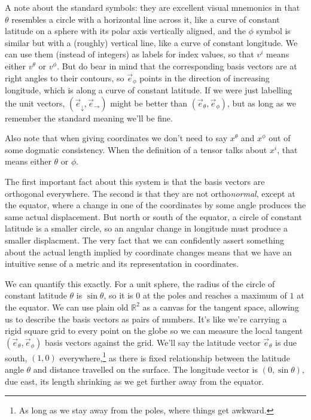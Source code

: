 A note about the standard symbols: they are excellent visual mnemonics in that $\theta$ resembles a circle with a horizontal line across it, like a curve of constant latitude on a sphere with its polar axis vertically aligned, and the $\phi$ symbol is similar but with a (roughly) vertical line, like a curve of constant longitude. We can use them (instead of integers) as labels for index values, so that $v^i$ means either $v^\theta$ or $v^\phi$. But do bear in mind that the corresponding basis vectors are at right angles to their contours, so $\vec{e}_{\phi}$ points in the direction of increasing longitude, which is along a curve of constant latitude. If we were just labelling the unit vectors, $(\vec{e}_{\downarrow}, \vec{e}_{\rightarrow})$ might be better than $(\vec{e}_{\theta}, \vec{e}_{\phi})$, but as long as we remember the standard meaning we'll be fine.

Also note that when giving coordinates we don't need to say $x^{\theta}$ and $x^{\phi}$ out of some dogmatic consistency. When the definition of a tensor talks about $x^i$, that means either $\theta$ or $\phi$.

The first important fact about this system is that the basis vectors are orthogonal everywhere. The second is that they are not ortho\textit{normal}, except at the equator, where a change in one of the coordinates by some angle produces the same actual displacement. But north or south of the equator, a circle of constant latitude is a smaller circle, so an angular change in longitude must produce a smaller displacment. The very fact that we can confidently assert something about the actual length implied by coordinate changes means that we have an intuitive sense of a metric and its representation in coordinates.

We can quantify this exactly. For a unit sphere, the radius of the circle of constant latitude $\theta$ is $\sin \theta$, so it is $0$ at the poles and reaches a maximum of $1$ at the equator. We can use plain old $\mathbb{R}^2$ as a canvas for the tangent space, allowing us to describe the basis vectors as pairs of numbers. It's like we're carrying a rigid square grid to every point on the globe so we can measure the local tangent $(\vec{e}_{\theta}, \vec{e}_{\phi})$ basis vectors against the grid. We'll say the latitude vector $\vec{e}_{\theta}$ is due south, $(1, 0)$ everywhere,\footnote{As long as we stay away from the poles, where things get awkward.} as there is fixed relationship between the latitude angle $\theta$ and distance travelled on the surface. The longitude vector is $(0, \sin \theta)$, due east, its length shrinking as we get further away from the equator.


